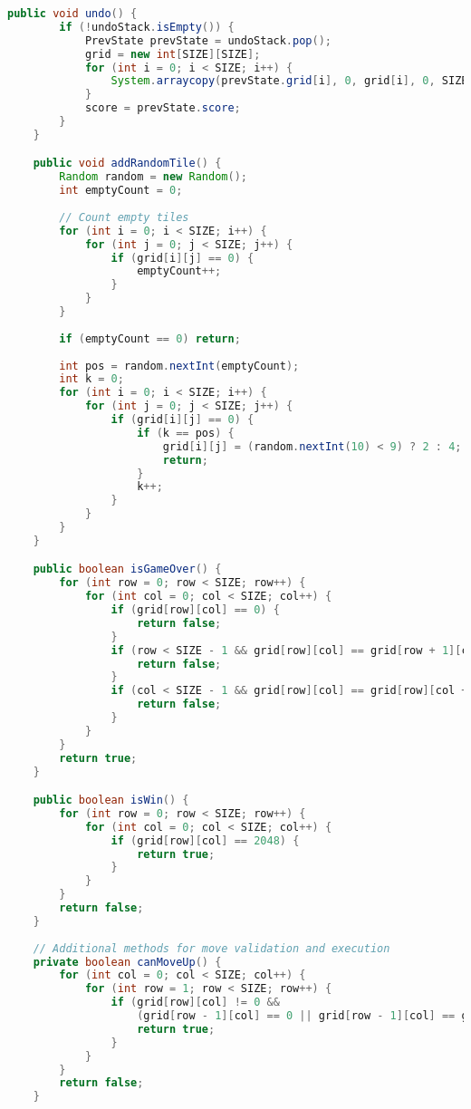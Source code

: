 \documentclass[12pt, a4paper]{article}
\begin{document}
\begin{lstlisting}[language=Java, caption=GameLogic Class Implementation]
    public void undo() {
        if (!undoStack.isEmpty()) {
            PrevState prevState = undoStack.pop();
            grid = new int[SIZE][SIZE];
            for (int i = 0; i < SIZE; i++) {
                System.arraycopy(prevState.grid[i], 0, grid[i], 0, SIZE);
            }
            score = prevState.score;
        }
    }

    public void addRandomTile() {
        Random random = new Random();
        int emptyCount = 0;
        
        // Count empty tiles
        for (int i = 0; i < SIZE; i++) {
            for (int j = 0; j < SIZE; j++) {
                if (grid[i][j] == 0) {
                    emptyCount++;
                }
            }
        }
        
        if (emptyCount == 0) return;
        
        int pos = random.nextInt(emptyCount);
        int k = 0;
        for (int i = 0; i < SIZE; i++) {
            for (int j = 0; j < SIZE; j++) {
                if (grid[i][j] == 0) {
                    if (k == pos) {
                        grid[i][j] = (random.nextInt(10) < 9) ? 2 : 4;
                        return;
                    }
                    k++;
                }
            }
        }
    }

    public boolean isGameOver() {
        for (int row = 0; row < SIZE; row++) {
            for (int col = 0; col < SIZE; col++) {
                if (grid[row][col] == 0) {
                    return false;
                }
                if (row < SIZE - 1 && grid[row][col] == grid[row + 1][col]) {
                    return false;
                }
                if (col < SIZE - 1 && grid[row][col] == grid[row][col + 1]) {
                    return false;
                }
            }
        }
        return true;
    }

    public boolean isWin() {
        for (int row = 0; row < SIZE; row++) {
            for (int col = 0; col < SIZE; col++) {
                if (grid[row][col] == 2048) {
                    return true;
                }
            }
        }
        return false;
    }
    
    // Additional methods for move validation and execution
    private boolean canMoveUp() {
        for (int col = 0; col < SIZE; col++) {
            for (int row = 1; row < SIZE; row++) {
                if (grid[row][col] != 0 && 
                    (grid[row - 1][col] == 0 || grid[row - 1][col] == grid[row][col])) {
                    return true;
                }
            }
        }
        return false;
    }
    

\end{lstlisting}
\end{document}
